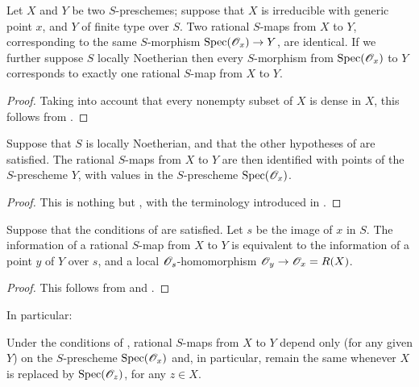 \begin{prop}[7.1.11]
\label{1.7.1.11}
Let $X$ and $Y$ be two $S$-preschemes; suppose that $X$ is irreducible with generic point $x$, and $Y$ of finite type over $S$.
Two rational $S$-maps from $X$ to $Y$, corresponding to the same $S$-morphism ${\mathop{\mathrm{Spec}}\nolimits}(\mathscr{O}_x)\to Y$, are identical.
If we further suppose $S$ locally Noetherian then every $S$-morphism from ${\mathop{\mathrm{Spec}}\nolimits}(\mathscr{O}_x)$ to $Y$ corresponds to exactly one rational $S$-map from $X$ to $Y$.
\end{prop}

\begin{proof}
\label{proof-1.7.1.11}
Taking into account that every nonempty subset of $X$ is dense in $X$, this follows from .
\end{proof}

\begin{cor}[7.1.12]
\label{1.7.1.12}
Suppose that $S$ is locally Noetherian, and that the other hypotheses of  are satisfied.
The rational $S$-maps from $X$ to $Y$ are then identified with points of the $S$-prescheme $Y$, with values in the $S$-prescheme ${\mathop{\mathrm{Spec}}\nolimits}(\mathscr{O}_x)$.
\end{cor}

\begin{proof}
\label{proof-1.7.1.12}
This is nothing but , with the terminology introduced in .
\end{proof}

\begin{cor}[7.1.13]
\label{1.7.1.13}
Suppose that the conditions of  are satisfied.
Let $s$ be the image of $x$ in $S$.
The information of a rational $S$-map from $X$ to $Y$ is equivalent to the information of a point $y$ of $Y$ over $s$, and a local $\mathscr{O}_s$-homomorphism $\mathscr{O}_y\to\mathscr{O}_x=R(X)$.
\end{cor}

\begin{proof}
\label{proof-1.7.1.13}
This follows from  and .
\end{proof}

In particular:
\begin{cor}[7.1.14]
\label{1.7.1.14}
Under the conditions of , rational $S$-maps from $X$ to $Y$ depend only (for any given $Y$) on the $S$-prescheme ${\mathop{\mathrm{Spec}}\nolimits}(\mathscr{O}_x)$ and, in particular, remain the same whenever $X$ is replaced by ${\mathop{\mathrm{Spec}}\nolimits}(\mathscr{O}_z)$, for any $z\in X$.
\end{cor}

